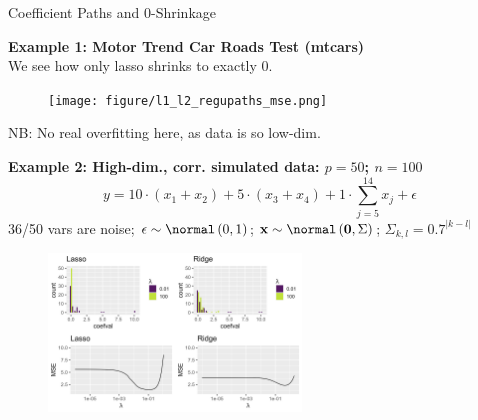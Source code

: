 \documentclass[11pt,compress,t,notes=noshow, xcolor=table]{beamer}
\begin{document}
\begin{vbframe}{Coefficient Paths and 0-Shrinkage}

\textbf{Example 1: Motor Trend Car Roads Test (mtcars)} \\

We see how only lasso shrinks to exactly 0.

\begin{figure}
\texttt{[image: figure/l1\_l2\_regupaths\_mse.png]}\\
\end{figure}
\vspace{-0.3cm}
NB: No real overfitting here, as data is so low-dim.

\framebreak
\textbf{Example 2: High-dim., corr. simulated data: $p=50$; $n=100$}
$$ y = 10 \cdot (x_1 + x_2) + 5 \cdot (x_3 + x_4) + 1 \cdot \sum_{j = 5}^{14} x_j + \epsilon $$
36/50 vars are noise; $\epsilon \sim \normal \left(0, 1\right)$; $\xv \sim \normal \left(\mathbf{0}, \Sigma \right)$; 
$\Sigma_{k,l}=0.7^{|k-l|}$ 



\begin{figure}
\includegraphics[width=0.6\textwidth]{figure/shrinkage_02.png}\\
\end{figure}

\end{vbframe}
\end{document}
